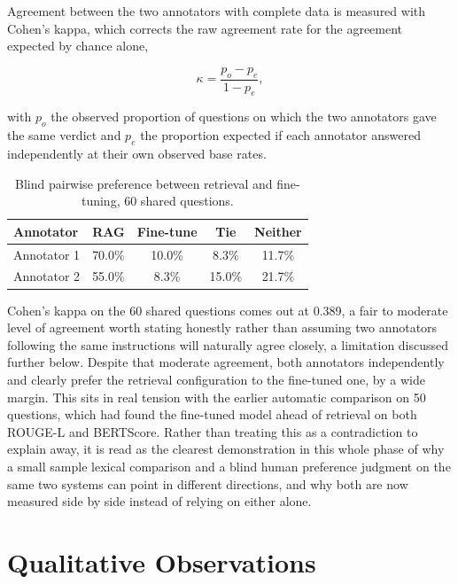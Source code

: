 \documentclass[11pt, a4paper]{article}
\begin{document}
Agreement between the two annotators with complete data is measured with Cohen's kappa, which corrects the raw agreement rate for the agreement expected by chance alone,

\begin{equation}
\kappa = \frac{p_o - p_e}{1 - p_e},
\end{equation}

with $p_o$ the observed proportion of questions on which the two annotators gave the same verdict and $p_e$ the proportion expected if each annotator answered independently at their own observed base rates.

\begin{table}[H]
\centering
\small
\begin{tabular}{lcccc}
\toprule
\textbf{Annotator} & \textbf{RAG} & \textbf{Fine-tune} & \textbf{Tie} & \textbf{Neither} \\
\midrule
Annotator 1 & 70.0\% & 10.0\% & 8.3\% & 11.7\% \\
Annotator 2 & 55.0\% & 8.3\% & 15.0\% & 21.7\% \\
\bottomrule
\end{tabular}
\caption{Blind pairwise preference between retrieval and fine-tuning, 60 shared questions.}
\label{tab:arena}
\end{table}

Cohen's kappa on the 60 shared questions comes out at 0.389, a fair to moderate level of agreement worth stating honestly rather than assuming two annotators following the same instructions will naturally agree closely, a limitation discussed further below. Despite that moderate agreement, both annotators independently and clearly prefer the retrieval configuration to the fine-tuned one, by a wide margin. This sits in real tension with the earlier automatic comparison on 50 questions, which had found the fine-tuned model ahead of retrieval on both ROUGE-L and BERTScore. Rather than treating this as a contradiction to explain away, it is read as the clearest demonstration in this whole phase of why a small sample lexical comparison and a blind human preference judgment on the same two systems can point in different directions, and why both are now measured side by side instead of relying on either alone.

\section{Qualitative Observations}
\label{sec:qualitative}
\end{document}
